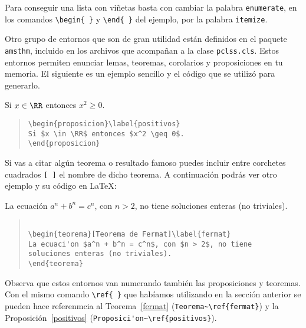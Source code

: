 Para conseguir una lista con vi\~netas basta con cambiar la palabra \texttt{enumerate},
en los comandos \verb|\begin{ }| y \verb|\end{ }| del ejemplo, por la palabra
\texttt{itemize}.

Otro 
grupo de entornos que son de gran utilidad est\'an definidos en el paquete
\texttt{amsthm}, incluido en los archivos que acompa\~nan a la clase \texttt{pclss.cls}.
Estos entornos permiten enunciar lemas, teoremas, corolarios y proposiciones en tu memoria.
El siguiente es un ejemplo sencillo y el c\'odigo que se utiliz\'o para generarlo.

\begin{proposition}\label{positivos}
Si $x \in \RR$ entonces $x^2 \geq 0$.
\end{proposition}

\begin{quote}
\begin{verbatim}
\begin{proposicion}\label{positivos}
Si $x \in \RR$ entonces $x^2 \geq 0$.
\end{proposicion}
\end{verbatim}
\end{quote}

Si vas a citar alg\'un teorema o resultado famoso puedes incluir entre corchetes
cuadrados \verb|[ ]| el nombre de dicho teorema. A continuaci\'on podr\'as ver otro ejemplo
y su c\'odigo en \LaTeX{}:

\begin{theorem}\label{fermat}
La ecuaci\'on $a^n + b^n = c^n$, con $n > 2$, no tiene
soluciones enteras (no triviales).
\end{theorem}

\begin{quote}
\begin{verbatim}

\begin{teorema}[Teorema de Fermat]\label{fermat}
La ecuaci'on $a^n + b^n = c^n$, con $n > 2$, no tiene
soluciones enteras (no triviales).
\end{teorema}

\end{verbatim}
\end{quote}

Observa 
que estos entornos van numerando tambi\'en las proposiciones y teoremas.
Con el mismo comando \verb|\ref{ }| que hab\'iamos utilizando en la secci\'on 
anterior se pueden hace referenmcia al Teorema~\ref{fermat} (\verb|Teorema~\ref{fermat}|)
y la Proposici\'on~\ref{positivos} (\verb|Proposici'on~\ref{positivos}|).

